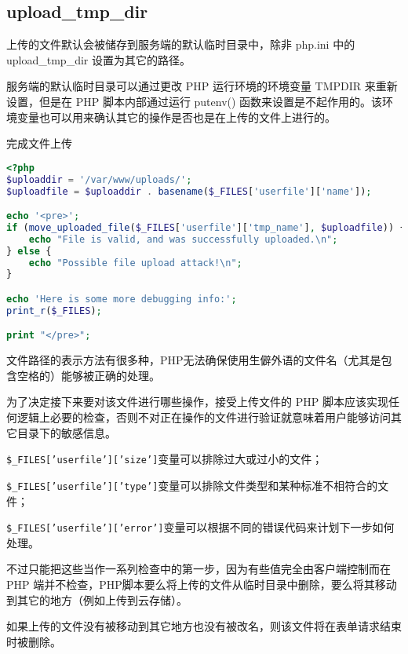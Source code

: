 \subsection{upload\_tmp\_dir}


上传的文件默认会被储存到服务端的默认临时目录中，除非 php.ini 中的 upload\_tmp\_dir 设置为其它的路径。

服务端的默认临时目录可以通过更改 PHP 运行环境的环境变量 TMPDIR 来重新设置，但是在 PHP 脚本内部通过运行 putenv() 函数来设置是不起作用的。该环境变量也可以用来确认其它的操作是否也是在上传的文件上进行的。


\begin{example}
完成文件上传
\begin{lstlisting}[language=PHP]
<?php
$uploaddir = '/var/www/uploads/';
$uploadfile = $uploaddir . basename($_FILES['userfile']['name']);

echo '<pre>';
if (move_uploaded_file($_FILES['userfile']['tmp_name'], $uploadfile)) {
    echo "File is valid, and was successfully uploaded.\n";
} else {
    echo "Possible file upload attack!\n";
}

echo 'Here is some more debugging info:';
print_r($_FILES);

print "</pre>";
\end{lstlisting}
\end{example}

文件路径的表示方法有很多种，PHP无法确保使用生僻外语的文件名（尤其是包含空格的）能够被正确的处理。


为了决定接下来要对该文件进行哪些操作，接受上传文件的 PHP 脚本应该实现任何逻辑上必要的检查，否则不对正在操作的文件进行验证就意味着用户能够访问其它目录下的敏感信息。



\begin{compactitem}
\item \texttt{\$\_FILES['userfile']['size']}变量可以排除过大或过小的文件；
\item \texttt{\$\_FILES['userfile']['type']}变量可以排除文件类型和某种标准不相符合的文件；
\item \texttt{\$\_FILES['userfile']['error']}变量可以根据不同的错误代码来计划下一步如何处理。
\end{compactitem}

不过只能把这些当作一系列检查中的第一步，因为有些值完全由客户端控制而在 PHP 端并不检查，PHP脚本要么将上传的文件从临时目录中删除，要么将其移动到其它的地方（例如上传到云存储）。

如果上传的文件没有被移动到其它地方也没有被改名，则该文件将在表单请求结束时被删除。



